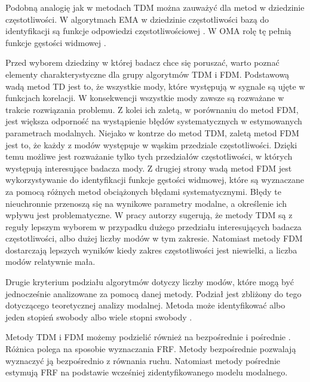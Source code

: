 Podobną analogię jak w metodach TDM można zauważyć dla metod w dziedzinie częstotliwości. W algorytmach EMA w dziedzinie częstotliwości bazą do identyfikacji są funkcje odpowiedzi częstotliwościowej . W OMA rolę tę pełnią funkcje gęstości widmowej .

Przed wyborem dziedziny w której badacz chce się poruszać, warto poznać elementy charakterystyczne dla grupy algorytmów TDM i FDM. Podstawową wadą metod TD jest to, że wszystkie mody, które występują w sygnale są ujęte w funkcjach korelacji. W konsekwencji wszystkie mody zawsze są rozważane w trakcie rozwiązania problemu. Z kolei ich zaletą, w porównaniu do metod FDM, jest większa odporność na wystąpienie błędów systematycznych w estymowanych parametrach modalnych. Niejako w kontrze do metod TDM, zaletą metod FDM jest to, że każdy z modów występuje w wąskim przedziale częstotliwości. Dzięki temu możliwe jest rozważanie tylko tych przedziałów częstotliwości, w których występują interesujące badacza mody. Z drugiej strony wadą metod FDM jest wykorzystywanie do identyfikacji funkcje gęstości widmowej, które są wyznaczane za pomocą różnych metod obciążonych błędami systematycznymi. Błędy te nieuchronnie przenoszą się na wynikowe parametry modalne, a określenie ich wpływu jest problematyczne. W pracy \cite{Maia1997} autorzy sugerują, że metody TDM są z reguły lepszym wyborem w przypadku dużego przedziału interesujących badacza częstotliwości, albo dużej liczby modów w tym zakresie. Natomiast metody FDM dostarczają lepszych wyników kiedy zakres częstotliwości jest niewielki, a liczba modów relatywnie mała. 

Drugie kryterium podziału algorytmów dotyczy liczby modów, które mogą być jednocześnie analizowane za pomocą danej metody. Podział jest zbliżony do tego dotyczącego teoretycznej analizy modalnej. Metoda może identyfikować albo jeden stopień swobody  albo wiele stopni swobody .

Metody TDM i FDM możemy podzielić również na bezpośrednie  i pośrednie . Różnica polega na sposobie wyznaczania FRF. Metody bezpośrednie pozwalają wyznaczyć ją bezpośrednio z równania ruchu. Natomiast metody pośrednie estymują FRF na podstawie wcześniej zidentyfikowanego modelu modalnego.

